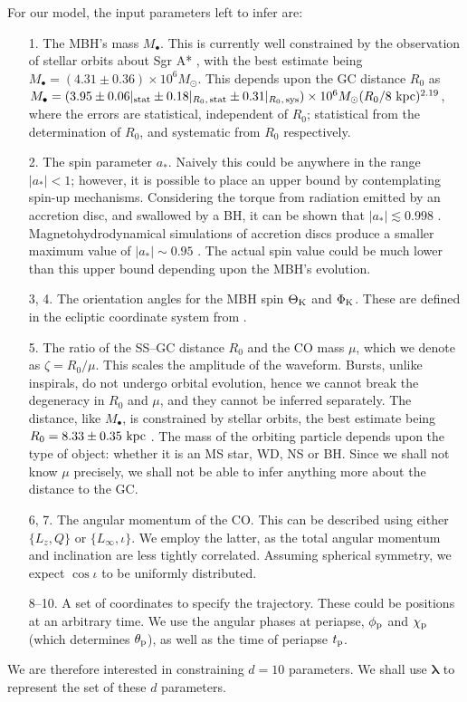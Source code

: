 For our model, the input parameters left to infer are:
\begin{enumerate}[leftmargin=*, widest=\:88--88.]
\item[1.] The MBH's mass $M_\bullet$. This is currently well constrained by the observation of stellar orbits about Sgr A* \citep{Ghez2008, Gillessen2009}, with the best estimate being $M_\bullet = (4.31 \pm 0.36) \times 10^6 M_\odot$. This depends upon the GC distance $R_0$ as $M_\bullet = (3.95 \pm 0.06|_\mathrm{stat} \pm 0.18|_{R_0, \, \mathrm{stat}} \pm  0.31|_{R_0, \, \mathrm{sys}}) \times 10^6 M_\odot (R_0 / 8~\mathrm{kpc})^{2.19}$, where the errors are statistical, independent of $R_0$; statistical from the determination of $R_0$, and systematic from $R_0$ respectively.
\item[2.] The spin parameter $a_\ast$. Naively this could be anywhere in the range $|a_\ast| < 1$; however, it is possible to place an upper bound by contemplating spin-up mechanisms. Considering the torque from radiation emitted by an accretion disc, and swallowed by a BH, it can be shown that $|a_\ast| \lesssim 0.998$ \citep{Thorne1974}. Magnetohydrodynamical simulations of accretion discs produce a smaller maximum value of $|a_\ast| \sim 0.95$ \citep{Gammie2004}. The actual spin value could be much lower than this upper bound depending upon the MBH's evolution.
\item[3, 4.] The orientation angles for the MBH spin $\Theta_\mathrm{K}$ and $\Phi_\mathrm{K}$. These are defined in the ecliptic coordinate system from .
\item[5.] The ratio of the SS--GC distance $R_0$ and the CO mass $\mu$, which we denote as $\zeta = R_0/\mu$. This scales the amplitude of the waveform. Bursts, unlike inspirals, do not undergo orbital evolution, hence we cannot break the degeneracy in $R_0$ and $\mu$, and they cannot be inferred separately. The distance, like $M_\bullet$, is constrained by stellar orbits, the best estimate being $R_0 = 8.33 \pm 0.35~\mathrm{kpc}$ \citep{Gillessen2009}. The mass of the orbiting particle depends upon the type of object: whether it is an MS star, WD, NS or BH. Since we shall not know $\mu$ precisely, we shall not be able to infer anything more about the distance to the GC.
\item[6, 7.] The angular momentum of the CO. This can be described using either $\{L_z, Q\}$ or $\{L_\infty, \iota\}$. We employ the latter, as the total angular momentum and inclination are less tightly correlated. Assuming spherical symmetry, we expect $\cos \iota$ to be uniformly distributed.
\item[8--10.] A set of coordinates to specify the trajectory. These could be positions at an arbitrary time. We use the angular phases at periapse, $\phi_\mathrm{p}$ and $\chi_\mathrm{p}$ (which determines $\theta_\mathrm{p}$), as well as the time of periapse $t_\mathrm{p}$.
\end{enumerate}
We are therefore interested in constraining $d = 10$ parameters. We shall use $\boldsymbol{\lambda}$ to represent the set of these $d$ parameters.


